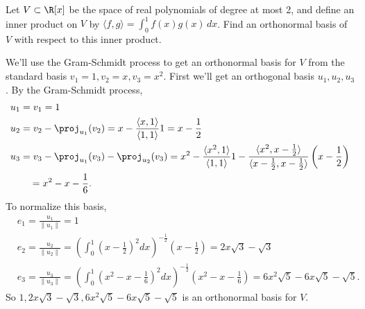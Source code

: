 \begin{problem}
Let $V\subset \R[x]$ be the space of real polynomials of degree at most 2, and define an inner product on $V$ by $\langle f,g\rangle=\int_0^1 f(x)g(x)\,dx$. Find an orthonormal basis of $V$ with respect to this inner product.
\end{problem}

We'll use the Gram-Schmidt process to get an orthonormal basis for $V$ from the standard basis $v_1=1, v_2=x, v_3=x^2$. First we'll get an orthogonal basis $u_1,u_2,u_3$. By the Gram-Schmidt process,
\[
  \begin{aligned}
    &u_1 = v_1 = 1\\
    &u_2 = v_2 - \proj_{u_1}(v_2) = x - \frac{\langle x, 1 \rangle}{\langle 1, 1\rangle}1 = x - \frac12\\
    &u_3 = v_3 - \proj_{u_1}(v_3) - \proj_{u_2}(v_3) = x^2 - \frac{\langle x^2, 1\rangle}{\langle 1, 1\rangle}1 - \frac{\langle x^2, x-\frac12 \rangle}{\langle x-\frac12, x-\frac12\rangle}\left(x-\frac12\right)\\
    &\quad\quad=x^2-x-\frac{1}{6}.
  \end{aligned}
\]
To normalize this basis,
\[
  \begin{aligned}
    &e_1 = \frac{u_1}{\| u_1\|} = 1\\
    &e_2 = \frac{u_2}{\| u_2\|} = \left(\int^1_0\left(x-\frac{1}{2}\right)^2 dx\right)^{-\frac12}\left(x-\frac12\right) = 2x\sqrt{3}-\sqrt{3}\\
    &e_3 = \frac{u_3}{\| u_3\|} = \left(\int^1_0\left(x^2-x-\frac{1}{6}\right)^2 dx\right)^{-\frac12}\left(x^2-x-\frac{1}{6}\right) = 6x^2\sqrt{5}-6x\sqrt{5}-\sqrt{5}.
  \end{aligned}
\]  
So $1, 2x\sqrt{3}-\sqrt{3}, 6x^2\sqrt{5}-6x\sqrt{5}-\sqrt{5}$ is an orthonormal basis for $V$. 
